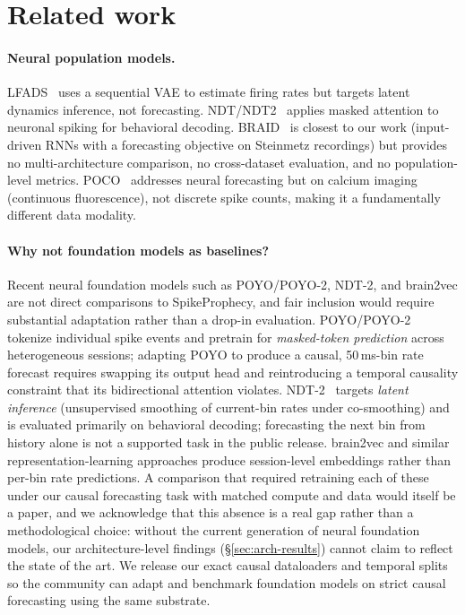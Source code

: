 \documentclass{article}
\begin{document}
\section{Related work}
\label{sec:related}

\paragraph{Neural population models.}
LFADS~\citep{pandarinath2018lfads} uses a sequential VAE to estimate
firing rates but targets latent dynamics inference, not forecasting.
NDT/NDT2~\citep{ye2021ndt} applies masked attention to neuronal spiking
for behavioral decoding.  BRAID~\citep{vahidi2025braid} is closest to our
work (input-driven RNNs with a forecasting objective on Steinmetz
recordings) but provides no multi-architecture comparison, no cross-dataset
evaluation, and no population-level metrics.
POCO~\citep{duan2025poco} addresses neural forecasting but on
calcium imaging (continuous fluorescence), not discrete spike counts, making
it a fundamentally different data modality.

\paragraph{Why not foundation models as baselines?}
Recent neural foundation models such as POYO/POYO-2, NDT-2, and brain2vec
are not direct comparisons to SpikeProphecy, and fair inclusion would
require substantial adaptation rather than a drop-in evaluation.
POYO/POYO-2~\citep{azabou2023poyo} tokenize individual spike
events and pretrain for \emph{masked-token prediction} across
heterogeneous sessions; adapting POYO to produce a causal, 50\,ms-bin
rate forecast requires swapping its output head and reintroducing a
temporal causality constraint that its bidirectional attention
violates.  NDT-2~\citep{ye2021ndt} targets \emph{latent inference}
(unsupervised smoothing of current-bin rates under co-smoothing) and
is evaluated primarily on behavioral decoding; forecasting the next
bin from history alone is not a supported task in the public release.
brain2vec and similar representation-learning approaches produce
session-level embeddings rather than per-bin rate predictions.  A
comparison that required retraining each of these under our causal
forecasting task with matched compute and data would itself be a
paper, and we acknowledge that this absence is a real gap rather than
a methodological choice: without the current generation of neural
foundation models, our architecture-level findings
(\S\ref{sec:arch-results}) cannot claim to reflect the state of the
art.  We
release our exact causal dataloaders and temporal splits so the
community can adapt and benchmark foundation models on strict causal
forecasting using the same substrate.
\end{document}
